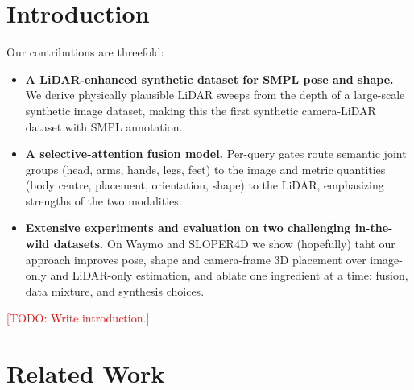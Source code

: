 \documentclass{egpubl}
\newcommand{\todo}[1]{\textcolor{red}{[TODO: #1]}}
\begin{document}
\section{Introduction}
\label{sec:intro}
Our contributions are threefold:
\begin{itemize}
  \item \textbf{A LiDAR-enhanced synthetic dataset for SMPL pose and
    shape.} We derive physically plausible LiDAR sweeps from the depth of
    a large-scale synthetic image dataset, making this the first synthetic 
    camera-LiDAR dataset with SMPL annotation.
  \item \textbf{A selective-attention fusion model.} Per-query gates route
    semantic joint groups (head, arms, hands, legs, feet) to the image and
    metric quantities (body centre, placement, orientation, shape) to the
    LiDAR, emphasizing strengths of the two modalities.
  \item \textbf{Extensive experiments and evaluation on two challenging
    in-the-wild datasets.} On Waymo and SLOPER4D we show (hopefully) taht our approach
    improves pose, shape and camera-frame 3D placement over image-only and
    LiDAR-only estimation, and ablate one ingredient at a time: fusion,
    data mixture, and synthesis choices.
\end{itemize}
\todo{Write introduction.}

\section{Related Work}
\label{sec:related}
\end{document}
